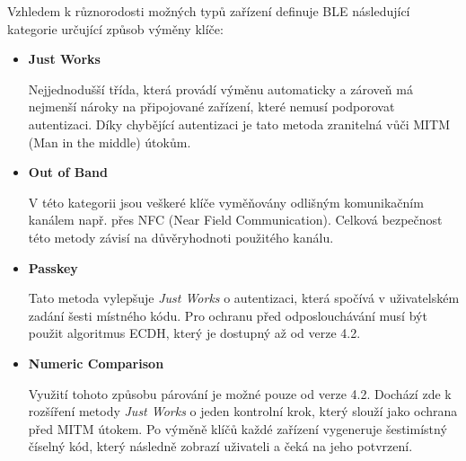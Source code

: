    Vzhledem k různorodosti možných typů zařízení definuje BLE následující kategorie
   určující způsob výměny klíče:
    \begin{itemize}
     \item \textbf{Just Works}
     
     Nejjednodušší třída, která provádí výměnu automaticky a zároveň má nejmenší nároky 
     na připojované zařízení, které nemusí podporovat autentizaci. Díky chybějící autentizaci 
     je tato metoda zranitelná vůči MITM (Man in the middle) útokům.
     \item \textbf{Out of Band}
     
     V této kategorii jsou veškeré klíče vyměňovány odlišným komunikačním kanálem např. přes NFC (Near Field Communication).
     Celková bezpečnost této metody závisí na důvěryhodnoti použitého kanálu.
     \item \textbf{Passkey}
     
     Tato metoda vylepšuje \textit{Just Works} o autentizaci, která spočívá v uživatelském zadání šesti 
     místného kódu. Pro ochranu před odposlouchávání musí být použit algoritmus ECDH, který je dostupný
     až od verze 4.2.
     
     \item \textbf{Numeric Comparison}
     
     Využití tohoto způsobu párování je možné pouze od verze 4.2. Dochází zde k rozšíření metody \textit{Just Works}
     o jeden kontrolní krok, který slouží jako ochrana před MITM útokem. Po výměně klíčů každé zařízení
     vygeneruje šestimístný číselný kód, který následně zobrazí uživateli a čeká na jeho potvrzení.   
     
    \end{itemize}
